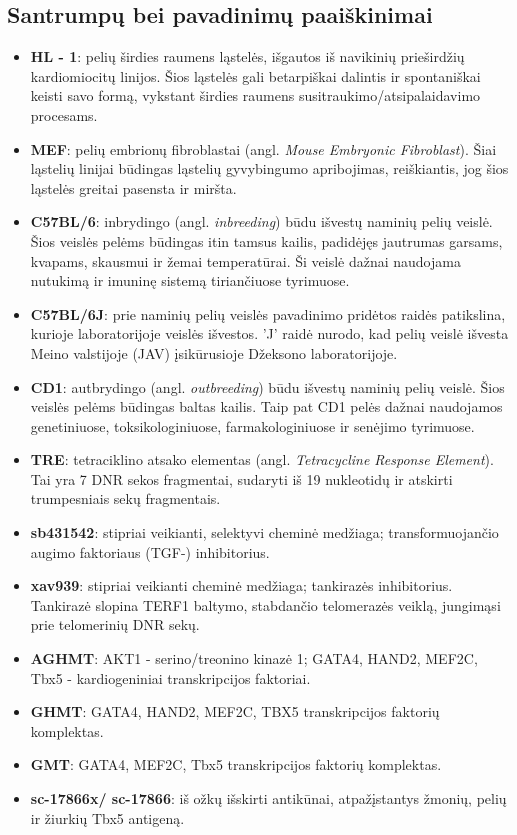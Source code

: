 \documentclass[12pt]{article}
\begin{document}
\subsection{Santrumpų bei pavadinimų paaiškinimai}
\begin{itemize}
    \item \textbf{HL - 1}: pelių širdies raumens ląstelės, išgautos iš
        navikinių prieširdžių kardiomiocitų linijos. Šios ląstelės gali
        betarpiškai dalintis ir spontaniškai keisti savo formą, vykstant
        širdies raumens susitraukimo/atsipalaidavimo procesams.
    \item \textbf{MEF}: pelių embrionų fibroblastai (angl. \emph{Mouse
        Embryonic Fibroblast}). Šiai ląstelių linijai būdingas ląstelių
        gyvybingumo apribojimas, reiškiantis, jog šios ląstelės greitai
        pasensta ir miršta.
    \item \textbf{C57BL/6}: inbrydingo (angl. \emph{inbreeding}) būdu išvestų
        naminių pelių veislė. Šios veislės pelėms būdingas itin tamsus
        kailis, padidėjęs jautrumas garsams, kvapams, skausmui ir žemai
        temperatūrai. Ši veislė dažnai naudojama nutukimą ir imuninę sistemą
        tiriančiuose tyrimuose.
    \item \textbf{C57BL/6J}: prie naminių pelių veislės pavadinimo pridėtos
        raidės patikslina, kurioje laboratorijoje veislės išvestos. 'J' raidė
        nurodo, kad pelių veislė išvesta Meino valstijoje (JAV) įsikūrusioje
        Džeksono laboratorijoje\cite{JCKSLAB}.
    \item \textbf{CD1}: autbrydingo (angl. \emph{outbreeding}) būdu išvestų
        naminių pelių veislė. Šios veislės pelėms būdingas baltas kailis.
        Taip pat CD1 pelės dažnai naudojamos genetiniuose, toksikologiniuose,
        farmakologiniuose ir senėjimo tyrimuose.
    \item \textbf{TRE}: tetraciklino atsako elementas (angl. \emph{Tetracycline
        Response Element}). Tai yra 7 DNR sekos fragmentai,
        sudaryti iš 19 nukleotidų ir atskirti trumpesniais sekų fragmentais.
    \item \textbf{sb431542}: stipriai veikianti, selektyvi cheminė medžiaga;
        transformuojančio augimo faktoriaus {\textbeta} (TGF-{\textbeta})
        inhibitorius.
    \item \textbf{xav939}: stipriai veikianti cheminė medžiaga; tankirazės
        inhibitorius. Tankirazė slopina TERF1 baltymo, stabdančio
        telomerazės veiklą, jungimąsi prie telomerinių DNR sekų.
    \item \textbf{AGHMT}: AKT1 - serino/treonino kinazė 1; GATA4, HAND2, MEF2C,
        Tbx5 - kardiogeniniai transkripcijos faktoriai.
    \item \textbf{GHMT}: GATA4, HAND2, MEF2C, TBX5 transkripcijos faktorių
        komplektas.
    \item \textbf{GMT}: GATA4, MEF2C, Tbx5 transkripcijos faktorių komplektas.
    \item \textbf{sc-17866x/ sc-17866}: iš ožkų išskirti antikūnai,
        atpažįstantys žmonių, pelių ir žiurkių Tbx5 antigeną.
\end{itemize}
\end{document}
